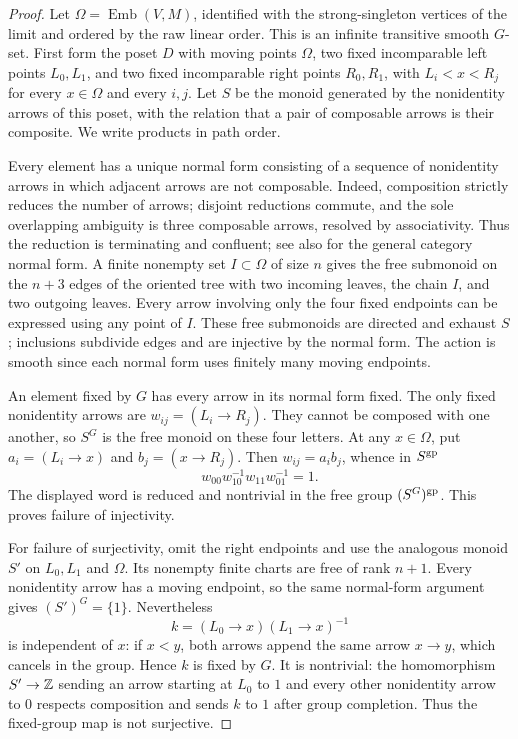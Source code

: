 \begin{proof}
Let $\Omega=\operatorname{Emb}(V,M)$, identified with the
strong-singleton vertices of the limit and ordered by the raw
linear order. This is an infinite transitive smooth $G$-set.
First form the poset $D$ with moving points $\Omega$, two fixed
incomparable left points $L_0,L_1$, and two fixed incomparable
right points $R_0,R_1$, with
$L_i<x<R_j$ for every $x\in\Omega$ and every $i,j$.
Let $S$ be the monoid generated by the nonidentity arrows of
this poset, with the relation that a pair of composable arrows
is their composite. We write products in path order.

Every element has a unique normal form consisting of a sequence
of nonidentity arrows in which adjacent arrows are not composable.
Indeed, composition strictly reduces the number of arrows;
disjoint reductions commute, and the sole overlapping ambiguity
is three composable arrows, resolved by associativity. Thus the
reduction is terminating and confluent; see also
\cite[Lemmas~3.3--3.4]{GWehrung2018} for the general category
normal form. A finite nonempty set
$I\subset\Omega$ of size $n$ gives the free submonoid on the
$n+3$ edges of the oriented tree with two incoming leaves,
the chain $I$, and two outgoing leaves. Every arrow involving
only the four fixed endpoints can be expressed using any point
of $I$. These free submonoids are directed and exhaust $S$;
inclusions subdivide edges and are injective by the normal form.
The action is smooth since each normal form uses finitely many
moving endpoints.

An element fixed by $G$ has every arrow in its normal form fixed.
The only fixed nonidentity arrows are
$w_{ij}=(L_i\to R_j)$. They cannot be composed with one another,
so $S^G$ is the free monoid on these four letters. At any
$x\in\Omega$, put $a_i=(L_i\to x)$ and $b_j=(x\to R_j)$.
Then $w_{ij}=a_i b_j$, whence in $S^{\mathrm{gp}}$
\[
 w_{00}w_{10}^{-1}w_{11}w_{01}^{-1}=1.
\]
The displayed word is reduced and nontrivial in the free group
$(S^G)^{\mathrm{gp}}$. This proves failure of injectivity.

For failure of surjectivity, omit the right endpoints and use
the analogous monoid $S'$ on $L_0,L_1$ and $\Omega$.
Its nonempty finite charts are free of rank $n+1$.
Every nonidentity arrow has a moving endpoint, so the same
normal-form argument gives $(S')^G=\{1\}$. Nevertheless
\[
 k=(L_0\to x)(L_1\to x)^{-1}
\]
is independent of $x$: if $x<y$, both arrows append the same
arrow $x\to y$, which cancels in the group. Hence $k$ is fixed
by $G$. It is nontrivial: the homomorphism $S'\to\mathbb Z$
sending an arrow starting at $L_0$ to $1$ and every other
nonidentity arrow to $0$ respects composition and sends $k$
to $1$ after group completion. Thus the fixed-group map is not
surjective.


\end{proof}
